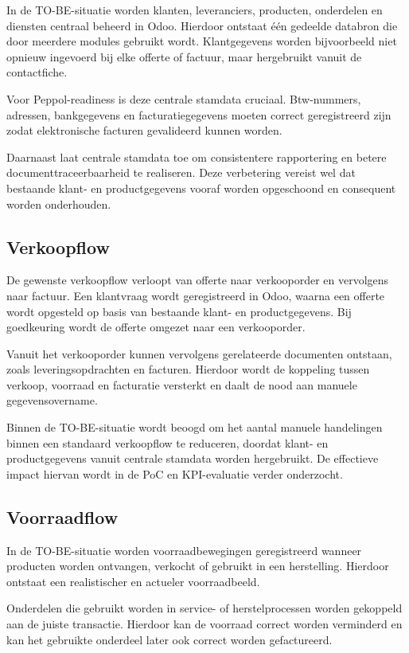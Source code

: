 In de TO-BE-situatie worden klanten, leveranciers, producten, onderdelen en diensten centraal beheerd in Odoo. Hierdoor ontstaat één gedeelde databron die door meerdere modules gebruikt wordt. Klantgegevens worden bijvoorbeeld niet opnieuw ingevoerd bij elke offerte of factuur, maar hergebruikt vanuit de contactfiche.

Voor Peppol-readiness is deze centrale stamdata cruciaal. Btw-nummers, adressen, bankgegevens en facturatiegegevens moeten correct geregistreerd zijn zodat elektronische facturen gevalideerd kunnen worden.

Daarnaast laat centrale stamdata toe om consistentere rapportering en betere documenttraceerbaarheid te realiseren. Deze verbetering vereist wel dat bestaande klant- en productgegevens vooraf worden opgeschoond en consequent worden onderhouden.

\subsection{Verkoopflow}

De gewenste verkoopflow verloopt van offerte naar verkooporder en vervolgens naar factuur. Een klantvraag wordt geregistreerd in Odoo, waarna een offerte wordt opgesteld op basis van bestaande klant- en productgegevens. Bij goedkeuring wordt de offerte omgezet naar een verkooporder.

Vanuit het verkooporder kunnen vervolgens gerelateerde documenten ontstaan, zoals leveringsopdrachten en facturen. Hierdoor wordt de koppeling tussen verkoop, voorraad en facturatie versterkt en daalt de nood aan manuele gegevensovername.

Binnen de TO-BE-situatie wordt beoogd om het aantal manuele handelingen binnen een standaard verkoopflow te reduceren, doordat klant- en productgegevens vanuit centrale stamdata worden hergebruikt. De effectieve impact hiervan wordt in de PoC en KPI-evaluatie verder onderzocht.

\subsection{Voorraadflow}

In de TO-BE-situatie worden voorraadbewegingen geregistreerd wanneer producten worden ontvangen, verkocht of gebruikt in een herstelling. Hierdoor ontstaat een realistischer en actueler voorraadbeeld.

Onderdelen die gebruikt worden in service- of herstelprocessen worden gekoppeld aan de juiste transactie. Hierdoor kan de voorraad correct worden verminderd en kan het gebruikte onderdeel later ook correct worden gefactureerd.

